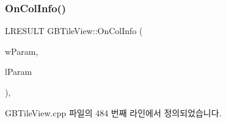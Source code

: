 \subsubsection{\texorpdfstring{On\+Col\+Info()}{OnColInfo()}}
{\footnotesize\ttfamily L\+R\+E\+S\+U\+LT G\+B\+Tile\+View\+::\+On\+Col\+Info (\begin{DoxyParamCaption}\item[{W\+P\+A\+R\+AM}]{w\+Param,  }\item[{L\+P\+A\+R\+AM}]{l\+Param }\end{DoxyParamCaption})\hspace{0.3cm}{\ttfamily [protected]}, {\ttfamily [virtual]}}



G\+B\+Tile\+View.\+cpp 파일의 484 번째 라인에서 정의되었습니다.


